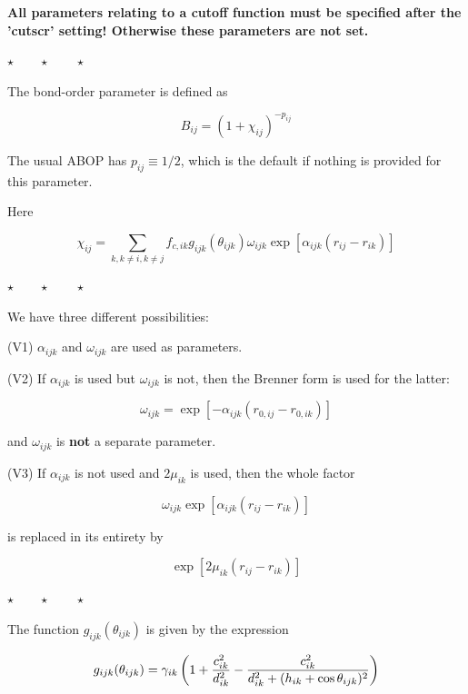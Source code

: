 \documentclass[a4paper,12pt,pdftex,onecolumn]{article}
\newcommand{\stars}{\begin{center}%
\vspace{1em plus 0.5em minus 0.5em}%
$\star \qquad \star \qquad \star$%
\vspace{1em plus 0.5em minus 0.5em}%
\end{center}}
\begin{document}
\textbf{All parameters relating to a cutoff function must be specified after the 'cutscr'
setting! Otherwise these parameters are not set.}

\stars

The bond-order parameter is defined as

\begin{equation}
B_{ij} = \left( 1 + \chi_{ij} \right)^{-p_{ij}}
\end{equation}

The usual ABOP has $p_{ij} \equiv 1/2$, which is the default if nothing is provided
for this parameter.

Here

\begin{equation}
\chi_{ij} =
\sum_{k, k \neq i, k \neq j} f_{c,ik} g_{ijk}(\theta_{ijk})
\omega_{ijk} \exp\left[ \alpha_{ijk}(r_{ij} - r_{ik}) \right]
\end{equation}

\stars

We have three different possibilities:

(V1) $\alpha_{ijk}$ and $\omega_{ijk}$ are used as parameters.

(V2) If $\alpha_{ijk}$ is used but $\omega_{ijk}$ is not, then the
Brenner form is used for the latter:

\begin{equation}
\omega_{ijk} = \exp\left[
- \alpha_{ijk} ( r_{0,ij} - r_{0,ik})
\right]
\label{eq:omegaijk}
\end{equation}

and $\omega_{ijk}$ is \textbf{not} a separate parameter.

(V3) If $\alpha_{ijk}$ is not used and $2\mu_{ik}$ is used, then the
whole factor

\begin{equation}
\omega_{ijk} \exp\left[ \alpha_{ijk}(r_{ij} - r_{ik}) \right]
\end{equation}

is replaced in its entirety by

\begin{equation}
\exp\left[ 2\mu_{ik} (r_{ij} - r_{ik}) \right]
\end{equation}

\stars

The function $g_{ijk}(\theta_{ijk})$ is given by the expression

\begin{equation}
g_{ijk}(\theta_{ijk}) = \gamma_{ik} \left(
1 + {c_{ik}^2 \over d_{ik}^2} - {c_{ik}^2 \over d_{ik}^2 + (h_{ik} + \cos \theta_{ijk})^2}
\right)
\end{equation}
\end{document}
